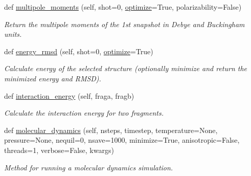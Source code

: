 \begin{DoxyCompactItemize}
\item 
def \hyperlink{classsrc_1_1tinkerio_1_1TINKER_aef7b87a4751dbf7365e0615a6c9f15ee}{multipole\+\_\+moments} (self, shot=0, \hyperlink{classsrc_1_1tinkerio_1_1TINKER_a925601bd948f7a34dd0a229da9b16f0a}{optimize}=True, polarizability=False)
\begin{DoxyCompactList}\small\item\em Return the multipole moments of the 1st snapshot in Debye and Buckingham units. \end{DoxyCompactList}\item 
def \hyperlink{classsrc_1_1tinkerio_1_1TINKER_a4aa91827c8809aa5f1d8a07ef66482d6}{energy\+\_\+rmsd} (self, shot=0, \hyperlink{classsrc_1_1tinkerio_1_1TINKER_a925601bd948f7a34dd0a229da9b16f0a}{optimize}=True)
\begin{DoxyCompactList}\small\item\em Calculate energy of the selected structure (optionally minimize and return the minimized energy and R\+M\+SD). \end{DoxyCompactList}\item 
def \hyperlink{classsrc_1_1tinkerio_1_1TINKER_a16f711409a34ee914ac3c9561907bc58}{interaction\+\_\+energy} (self, fraga, fragb)
\begin{DoxyCompactList}\small\item\em Calculate the interaction energy for two fragments. \end{DoxyCompactList}\item 
def \hyperlink{classsrc_1_1tinkerio_1_1TINKER_a337833adac99202891b64a14bf92a7c2}{molecular\+\_\+dynamics} (self, nsteps, timestep, temperature=None, pressure=None, nequil=0, nsave=1000, minimize=True, anisotropic=False, threads=1, verbose=False, kwargs)
\begin{DoxyCompactList}\small\item\em Method for running a molecular dynamics simulation. \end{DoxyCompactList}\end{DoxyCompactItemize}
